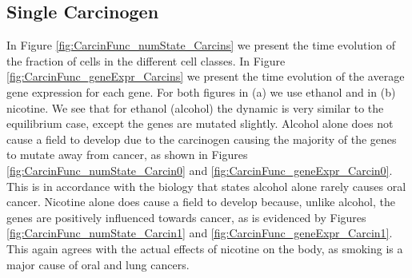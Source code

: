 \documentclass[\main/thesis.tex]{subfiles}
\begin{document}
\subsection{Single Carcinogen}
In Figure \ref{fig:CarcinFunc_numState_Carcins} we present the time evolution of the fraction of cells in the different cell classes. In Figure \ref{fig:CarcinFunc_geneExpr_Carcins} we present the time evolution of the average gene expression for each gene. For both figures in (a) we use ethanol and in (b) nicotine. We see that for ethanol (alcohol) the dynamic is very similar to the equilibrium case, except the genes are mutated slightly. Alcohol alone does not cause a field to develop due to the carcinogen causing the majority of the genes to mutate away from cancer, as shown in Figures \ref{fig:CarcinFunc_numState_Carcin0} and \ref{fig:CarcinFunc_geneExpr_Carcin0}. This is in accordance with the biology that states alcohol alone rarely causes oral cancer. Nicotine alone does cause a field to develop because, unlike alcohol, the genes are positively influenced towards cancer, as is evidenced by Figures \ref{fig:CarcinFunc_numState_Carcin1} and \ref{fig:CarcinFunc_geneExpr_Carcin1}. This again agrees with the actual effects of nicotine on the body, as smoking is a major cause of oral and lung cancers. 
\end{document}
